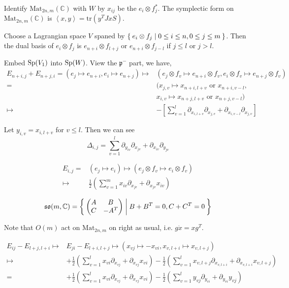 \documentclass[12pt]{article}
\def\Mat{{\rm Mat}}
\def\bC{{\mathbb{C}}}
\def\inn#1#2{\left\langle{#1},{#2}\right\rangle}
\def\Sp{{\rm Sp}}
\def\aso{\mathfrak{so}}
\def\fpp{\mathfrak{p}}
\def\tr{\mathrm{tr}}
\def\Mat{\mathrm{Mat}}
\begin{document}
Identify $\Mat_{2n,m}(\bC)$ with $W$ by $x_{ij}$ be the $e_i\otimes f_j^*$.
The symplectic form on $\Mat_{2n,m}(\bC)$ is $\inn{x}{y} = \tr(y^TJxS)$.

Choose a Lagrangian space $V$ spaned by
$\Set{e_i\otimes f_j|0\leq i\leq n, 0\leq j \leq m}$.
Then the dual basis of $e_i\otimes f_j$ is 
$e_{n+i}\otimes f_{l+j}$ or $e_{n+i} \otimes f_{j-l}$ if $j\leq l$ or $j>l$. 

Embed $\Sp(V_1)$ into $\Sp(W)$. View the $\fpp^-$ part,
we have, 
\begin{align*}
 E_{n+i,j}+ E_{n+j,i} = (e_{j}\mapsto e_{n+i}, e_{i}\mapsto e_{n+j})  
\mapsto& (e_j\otimes f_v \mapsto e_{n+i}\otimes f_v,
 e_i\otimes f_v \mapsto e_{n+j}\otimes f_v)\\
 =&( x_{j,v}\mapsto x_{n+i,l+v}\text{ or } x_{n+i,v-l}, \\
 &x_{i,v}\mapsto x_{n+j,l+v}\text{ or } x_{n+j,v-l})\\
\mapsto& -[
\sum_{v=1}^l\partial_{x_{i,l+v}}\partial_{x_{j,v}} 
+ \partial_{x_{i,v-l}}\partial_{x_{j,v}}]
\end{align*}

Let $y_{i,v} = x_{i,l+v}$ for $v\leq l$.
Then we can see 
\[
\Delta_{i,j} = \sum_{v=1}^l \partial_{y_{iv}}\partial_{x_{jv}}
+ \partial_{x_{iv}}\partial_{y_{jv}}
\] 

\[
\begin{split}
E_{i,j} =& (e_j\mapsto e_i) \mapsto (e_j\otimes f_v \mapsto e_i\otimes f_v)\\
 \mapsto& \frac{1}{2}(\sum_{v=1}^m x_{iv}\partial_{x_{jv}}+ \partial_{x_{jv}}x_{iv}) 
\end{split}
\]

\[
\aso(m,\bC) = \Set{
\begin{pmatrix}
A & B\\
C & -A^T
\end{pmatrix}| B+B^T=0, C+C^T=0}
\]

Note that $O(m)$ act on $\Mat_{2n,m}$ on right as usual,
i.e. $g\dot x = xg^T$.

\[
\begin{split}
E_{ij} - E_{l+j,l+i} \mapsto & E_{ji}-E_{l+i,l+j}
\mapsto (x_{vj}\mapsto -x_{vi}, x_{v,l+i}\mapsto x_{v,l+j})\\
\mapsto & 
+\frac{1}{2}(\sum_{v=1}^l x_{vi}\partial_{x_{vj}}+ \partial_{x_{vj}}x_{vi})
-\frac{1}{2}(\sum_{v=1}^l x_{v,l+j}\partial_{x_{v,l+i}}+ \partial_{x_{v,l+i}} x_{v,l+j})
\\
=&
+\frac{1}{2}(\sum_{v=1}^l x_{vi}\partial_{x_{vj}}+ \partial_{x_{vj}}x_{vi})
-\frac{1}{2}(\sum_{v=1}^l y_{vj}\partial_{y_{vi}}+ \partial_{y_{vi}} y_{vj})
\end{split}
\] 
\end{document}
